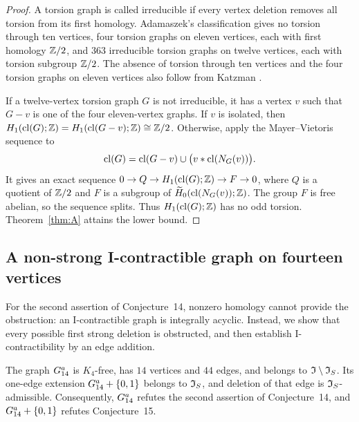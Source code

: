 \begin{proof}
A torsion graph is called irreducible if every vertex deletion removes
all torsion from its first homology. Adamaszek's classification
\cite[Theorem~1.1 and Section~4]{Adamaszek2014} gives no torsion through
ten vertices, four torsion graphs on eleven vertices, each with first
homology $\mathbb Z/2$, and $363$ irreducible torsion graphs on twelve vertices,
each with torsion subgroup $\mathbb Z/2$. The absence of torsion through ten vertices and the four torsion
graphs on eleven vertices also follow from Katzman
\cite[Theorem~4.1 and Section~5]{Katzman2006}.

If a twelve-vertex torsion graph $G$ is not irreducible, it has a vertex
$v$ such that $G-v$ is one of the four eleven-vertex graphs. If $v$ is
isolated, then $H_1(\operatorname{cl}(G);\mathbb Z)=H_1(\operatorname{cl}(G-v);\mathbb Z)\cong\mathbb Z/2$.
Otherwise, apply the Mayer--Vietoris sequence to
\[
 \operatorname{cl}(G)=\operatorname{cl}(G-v)\cup\bigl(v*\operatorname{cl}(N_G(v))\bigr).
\]
It gives an exact sequence
$0\to Q\to H_1(\operatorname{cl}(G);\mathbb Z)\to F\to0$, where $Q$ is a quotient of
$\mathbb Z/2$ and $F$ is a subgroup of
$\widetilde H_0(\operatorname{cl}(N_G(v));\mathbb Z)$. The group $F$ is free abelian,
so the sequence splits. Thus $H_1(\operatorname{cl}(G);\mathbb Z)$ has no odd torsion.
Theorem~\ref{thm:A} attains the lower bound.
\end{proof}

\subsection{A non-strong I-contractible graph on fourteen vertices}
\label{sec:fourteen}

For the second assertion of Conjecture~14, nonzero homology cannot
provide the obstruction: an I-contractible graph is integrally
acyclic. Instead, we show that every possible first strong deletion
is obstructed, and then establish I-contractibility by an edge addition.

\begin{theorem}\label{thm:B}
The graph $G_{14}^{a}$ is $K_4$-free, has $14$ vertices and $44$ edges, and
belongs to $\mathfrak I\setminus\mathfrak I_S$. Its one-edge extension $G_{14}^{a}+\{0,1\}$ belongs to
$\mathfrak I_S$, and deletion of that edge is $\mathfrak I_S$-admissible.
Consequently, $G_{14}^{a}$ refutes the second assertion of Conjecture~14,
and $G_{14}^{a}+\{0,1\}$ refutes Conjecture~15.
\end{theorem}

